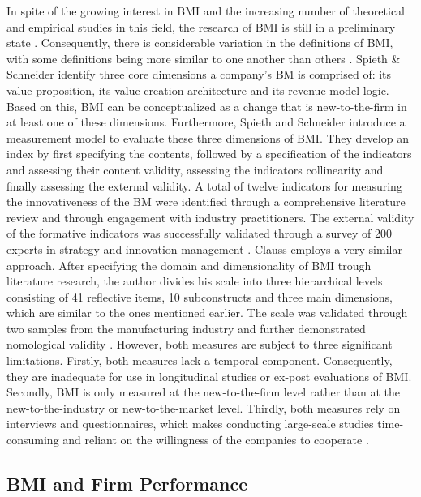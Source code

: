 \documentclass[manuscript,screen,review]{acmart}
\begin{document}
In spite of the growing interest in BMI and the increasing number of
theoretical and empirical studies in this field, the research of BMI is
still in a preliminary state \citep{huang_review_2023}. Consequently,
there is considerable variation in the definitions of BMI, with some
definitions being more similar to one another than others
\citep{foss_fifteen_2017}. Spieth \& Schneider
\citeyearpar{spieth_business_2016} identify three core dimensions a
company's BM is comprised of: its value proposition, its value creation
architecture and its revenue model logic. Based on this, BMI can be
conceptualized as a change that is new-to-the-firm in at least one of
these dimensions. Furthermore, Spieth and Schneider
\citeyearpar{spieth_business_2016} introduce a measurement model to
evaluate these three dimensions of BMI. They develop an index by first
specifying the contents, followed by a specification of the indicators
and assessing their content validity, assessing the indicators
collinearity and finally assessing the external validity. A total of
twelve indicators for measuring the innovativeness of the BM were
identified through a comprehensive literature review and through
engagement with industry practitioners. The external validity of the
formative indicators was successfully validated through a survey of 200
experts in strategy and innovation management
\citep{spieth_business_2016}. Clauss \citeyearpar{clauss_measuring_2017}
employs a very similar approach. After specifying the domain and
dimensionality of BMI trough literature research, the author divides his
scale into three hierarchical levels consisting of 41 reflective items,
10 subconstructs and three main dimensions, which are similar to the
ones mentioned earlier. The scale was validated through two samples from
the manufacturing industry and further demonstrated nomological validity
\citep{clauss_measuring_2017}. However, both measures are subject to
three significant limitations. Firstly, both measures lack a temporal
component. Consequently, they are inadequate for use in longitudinal
studies or ex-post evaluations of BMI. Secondly, BMI is only measured at
the new-to-the-firm level rather than at the new-to-the-industry or
new-to-the-market level. Thirdly, both measures rely on interviews and
questionnaires, which makes conducting large-scale studies
time-consuming and reliant on the willingness of the companies to
cooperate \citep{clauss_measuring_2017, spieth_business_2016}.

\subsection{BMI and Firm Performance}\label{bmi-and-firm-performance}
\end{document}
